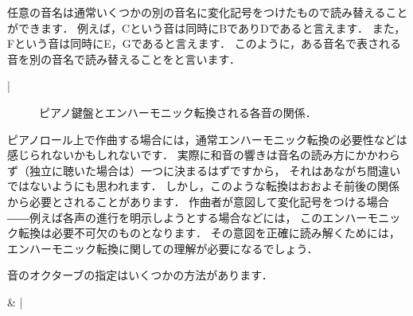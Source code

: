 \documentclass[dvipdfmx,uplatex,b5paper,openany,jbase=12Q,nomag*,textwidth-limit=44%
               ]{gachimuchi}
\begin{document}
任意の音名は通常いくつかの別の音名に変化記号をつけたもので読み替えることができます．
例えば，Cという音は同時にB\aSharp でありD\adFlat であると言えます．
また，F\aSharp という音は同時にE\adSharp ，G\aFlat であると言えます．
このように，ある音名で表される音を別の音名で読み替えることをと言います．
\begin{Music}[0.6\linewidth]
  \nostartrule%
  \Startpiece%
  \Notes%
  \en\bar%
  \Notes%
  \en\setdoublebar%
  \endpiece%
\end{Music}
\begin{figure}[ht]
  \centering
  
  \caption{ピアノ鍵盤とエンハーモニック転換される各音の関係．}\vspace{-\Cvs}
\end{figure}

\begin{Yodan}
  ピアノロール上で作曲する場合には，通常エンハーモニック転換の必要性などは感じられないかもしれないです．
  実際に和音の響きは音名の読み方にかかわらず（独立に聴いた場合は）一つに決まるはずですから，
  それはあながち間違いではないようにも思われます．
  しかし，このような転換はおおよそ前後の関係から必要とされることがあります．
  作曲者が意図して変化記号をつける場合――例えば各声の進行を明示しようとする場合などには，
  このエンハーモニック転換は必要不可欠のものとなります．
  その意図を正確に読み解くためには，エンハーモニック転換に関しての理解が必要になるでしょう．
\end{Yodan}

音のオクターブの指定はいくつかの方法があります．
\begin{Music}[0.7\linewidth]
  \indivbarrules
  \indivstartbarrules%
  \Startpiece%
  \znotes
  \en
  \Notes%
  \sk%
  \sk%
  \sk%
  \sk%
  \sk%
  \sk%
  \sk%
  \sk%
  \sk%
  &%
  |\sk%
  \sk%
  \sk%
  \sk%
  \en%
  \endpiece%
\end{Music}
\end{document}
